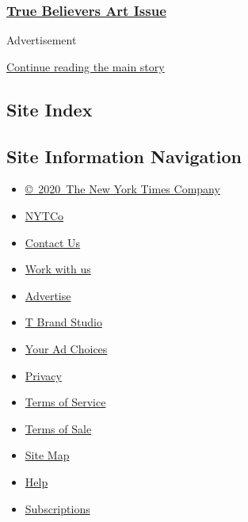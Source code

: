 \hypertarget{true-believers-art-issue}{%
\subsubsection{\texorpdfstring{\href{https://www.nytimes.com/issue/t-magazine/2020/07/02/true-believers-art-issue}{True
Believers Art
Issue}}{True Believers Art Issue}}\label{true-believers-art-issue}}

Advertisement

\protect\hyperlink{after-bottom}{Continue reading the main story}

\hypertarget{site-index}{%
\subsection{Site Index}\label{site-index}}

\hypertarget{site-information-navigation}{%
\subsection{Site Information
Navigation}\label{site-information-navigation}}

\begin{itemize}
\tightlist
\item
  \href{https://help.nytimes.com/hc/en-us/articles/115014792127-Copyright-notice}{©~2020~The
  New York Times Company}
\end{itemize}

\begin{itemize}
\tightlist
\item
  \href{https://www.nytco.com/}{NYTCo}
\item
  \href{https://help.nytimes.com/hc/en-us/articles/115015385887-Contact-Us}{Contact
  Us}
\item
  \href{https://www.nytco.com/careers/}{Work with us}
\item
  \href{https://nytmediakit.com/}{Advertise}
\item
  \href{http://www.tbrandstudio.com/}{T Brand Studio}
\item
  \href{https://www.nytimes.com/privacy/cookie-policy\#how-do-i-manage-trackers}{Your
  Ad Choices}
\item
  \href{https://www.nytimes.com/privacy}{Privacy}
\item
  \href{https://help.nytimes.com/hc/en-us/articles/115014893428-Terms-of-service}{Terms
  of Service}
\item
  \href{https://help.nytimes.com/hc/en-us/articles/115014893968-Terms-of-sale}{Terms
  of Sale}
\item
  \href{https://spiderbites.nytimes.com}{Site Map}
\item
  \href{https://help.nytimes.com/hc/en-us}{Help}
\item
  \href{https://www.nytimes.com/subscription?campaignId=37WXW}{Subscriptions}
\end{itemize}
